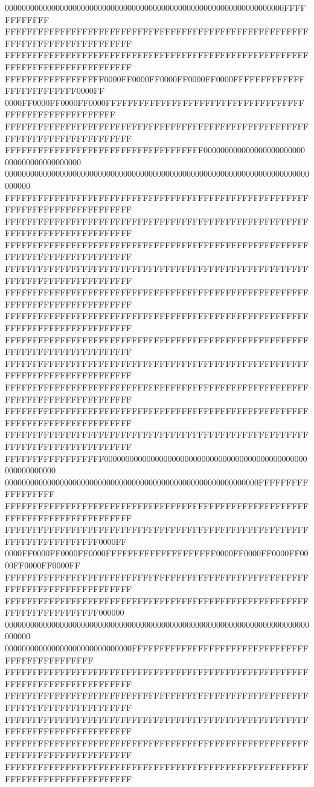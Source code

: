 000000000000000000000000000000000000000000000000000000000000000000FFFFFFFFFFFF
FFFFFFFFFFFFFFFFFFFFFFFFFFFFFFFFFFFFFFFFFFFFFFFFFFFFFFFFFFFFFFFFFFFFFFFFFFFFFF
FFFFFFFFFFFFFFFFFFFFFFFFFFFFFFFFFFFFFFFFFFFFFFFFFFFFFFFFFFFFFFFFFFFFFFFFFFFFFF
FFFFFFFFFFFFFFFFFF0000FF0000FF0000FF0000FF0000FFFFFFFFFFFFFFFFFFFFFFFFFF0000FF
0000FF0000FF0000FF0000FFFFFFFFFFFFFFFFFFFFFFFFFFFFFFFFFFFFFFFFFFFFFFFFFFFFFFFF
FFFFFFFFFFFFFFFFFFFFFFFFFFFFFFFFFFFFFFFFFFFFFFFFFFFFFFFFFFFFFFFFFFFFFFFFFFFFFF
FFFFFFFFFFFFFFFFFFFFFFFFFFFFFFFFFFFF000000000000000000000000000000000000000000
000000000000000000000000000000000000000000000000000000000000000000000000000000
FFFFFFFFFFFFFFFFFFFFFFFFFFFFFFFFFFFFFFFFFFFFFFFFFFFFFFFFFFFFFFFFFFFFFFFFFFFFFF
FFFFFFFFFFFFFFFFFFFFFFFFFFFFFFFFFFFFFFFFFFFFFFFFFFFFFFFFFFFFFFFFFFFFFFFFFFFFFF
FFFFFFFFFFFFFFFFFFFFFFFFFFFFFFFFFFFFFFFFFFFFFFFFFFFFFFFFFFFFFFFFFFFFFFFFFFFFFF
FFFFFFFFFFFFFFFFFFFFFFFFFFFFFFFFFFFFFFFFFFFFFFFFFFFFFFFFFFFFFFFFFFFFFFFFFFFFFF
FFFFFFFFFFFFFFFFFFFFFFFFFFFFFFFFFFFFFFFFFFFFFFFFFFFFFFFFFFFFFFFFFFFFFFFFFFFFFF
FFFFFFFFFFFFFFFFFFFFFFFFFFFFFFFFFFFFFFFFFFFFFFFFFFFFFFFFFFFFFFFFFFFFFFFFFFFFFF
FFFFFFFFFFFFFFFFFFFFFFFFFFFFFFFFFFFFFFFFFFFFFFFFFFFFFFFFFFFFFFFFFFFFFFFFFFFFFF
FFFFFFFFFFFFFFFFFFFFFFFFFFFFFFFFFFFFFFFFFFFFFFFFFFFFFFFFFFFFFFFFFFFFFFFFFFFFFF
FFFFFFFFFFFFFFFFFFFFFFFFFFFFFFFFFFFFFFFFFFFFFFFFFFFFFFFFFFFFFFFFFFFFFFFFFFFFFF
FFFFFFFFFFFFFFFFFFFFFFFFFFFFFFFFFFFFFFFFFFFFFFFFFFFFFFFFFFFFFFFFFFFFFFFFFFFFFF
FFFFFFFFFFFFFFFFFFFFFFFFFFFFFFFFFFFFFFFFFFFFFFFFFFFFFFFFFFFFFFFFFFFFFFFFFFFFFF
FFFFFFFFFFFFFFFFFF000000000000000000000000000000000000000000000000000000000000
000000000000000000000000000000000000000000000000000000000000FFFFFFFFFFFFFFFFFF
FFFFFFFFFFFFFFFFFFFFFFFFFFFFFFFFFFFFFFFFFFFFFFFFFFFFFFFFFFFFFFFFFFFFFFFFFFFFFF
FFFFFFFFFFFFFFFFFFFFFFFFFFFFFFFFFFFFFFFFFFFFFFFFFFFFFFFFFFFFFFFFFFFFFFFF0000FF
0000FF0000FF0000FF0000FFFFFFFFFFFFFFFFFFFF0000FF0000FF0000FF0000FF0000FF0000FF
FFFFFFFFFFFFFFFFFFFFFFFFFFFFFFFFFFFFFFFFFFFFFFFFFFFFFFFFFFFFFFFFFFFFFFFFFFFFFF
FFFFFFFFFFFFFFFFFFFFFFFFFFFFFFFFFFFFFFFFFFFFFFFFFFFFFFFFFFFFFFFFFFFFFFFF000000
000000000000000000000000000000000000000000000000000000000000000000000000000000
000000000000000000000000000000FFFFFFFFFFFFFFFFFFFFFFFFFFFFFFFFFFFFFFFFFFFFFFFF
FFFFFFFFFFFFFFFFFFFFFFFFFFFFFFFFFFFFFFFFFFFFFFFFFFFFFFFFFFFFFFFFFFFFFFFFFFFFFF
FFFFFFFFFFFFFFFFFFFFFFFFFFFFFFFFFFFFFFFFFFFFFFFFFFFFFFFFFFFFFFFFFFFFFFFFFFFFFF
FFFFFFFFFFFFFFFFFFFFFFFFFFFFFFFFFFFFFFFFFFFFFFFFFFFFFFFFFFFFFFFFFFFFFFFFFFFFFF
FFFFFFFFFFFFFFFFFFFFFFFFFFFFFFFFFFFFFFFFFFFFFFFFFFFFFFFFFFFFFFFFFFFFFFFFFFFFFF
FFFFFFFFFFFFFFFFFFFFFFFFFFFFFFFFFFFFFFFFFFFFFFFFFFFFFFFFFFFFFFFFFFFFFFFFFFFFFF
